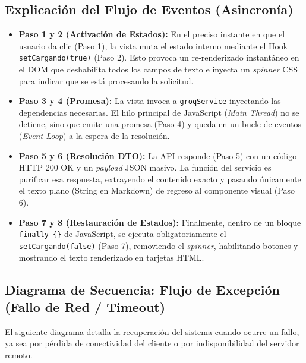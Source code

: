 \subsection{Explicación del Flujo de Eventos (Asincronía)}
\begin{itemize}
    \item \textbf{Paso 1 y 2 (Activación de Estados):} En el preciso instante en que el usuario da clic (Paso 1), la vista muta el estado interno mediante el Hook \texttt{setCargando(true)} (Paso 2). Esto provoca un re-renderizado instantáneo en el DOM que deshabilita todos los campos de texto e inyecta un \textit{spinner} CSS para indicar que se está procesando la solicitud.
    \item \textbf{Paso 3 y 4 (Promesa):} La vista invoca a \texttt{groqService} inyectando las dependencias necesarias. El hilo principal de JavaScript (\textit{Main Thread}) no se detiene, sino que emite una promesa (Paso 4) y queda en un bucle de eventos (\textit{Event Loop}) a la espera de la resolución.
    \item \textbf{Paso 5 y 6 (Resolución DTO):} La API responde (Paso 5) con un código HTTP 200 OK y un \textit{payload} JSON masivo. La función del servicio es purificar esa respuesta, extrayendo el contenido exacto y pasando únicamente el texto plano (String en Markdown) de regreso al componente visual (Paso 6).
    \item \textbf{Paso 7 y 8 (Restauración de Estados):} Finalmente, dentro de un bloque \texttt{finally \{\}} de JavaScript, se ejecuta obligatoriamente el \texttt{setCargando(false)} (Paso 7), removiendo el \textit{spinner}, habilitando botones y mostrando el texto renderizado en tarjetas HTML.
\end{itemize}

\subsection{Diagrama de Secuencia: Flujo de Excepción (Fallo de Red / Timeout)}

El siguiente diagrama detalla la recuperación del sistema cuando ocurre un fallo, ya sea por pérdida de conectividad del cliente o por indisponibilidad del servidor remoto.

